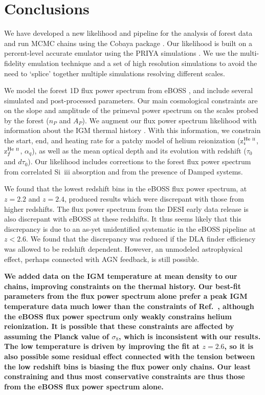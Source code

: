 \section{Conclusions}\label{sec:conclusions}

We have developed a new likelihood and pipeline for the analysis of \Lya forest data and run MCMC chains using the Cobaya package \cite{2021JCAP...05..057T, 2019ascl.soft10019T}.
Our likelihood is built on a percent-level accurate emulator using the PRIYA simulations \cite{2023simsuite}.
We use the multi-fidelity emulation technique \cite{2022MNRAS.517.3200F} and a set of high resolution simulations to avoid the need to `splice' together multiple simulations resolving different scales.

We model the \Lya forest 1D flux power spectrum from eBOSS \cite{2019JCAP...07..017C}, and include several simulated and post-processed parameters.
Our main cosmological constraints are on the slope and amplitude of the primeval power spectrum on the scales probed by the \Lya forest ($n_P$ and $A_P$). 
We augment our \Lya flux power spectrum likelihood with information about the IGM thermal history \cite{2021MNRAS.506.4389G}.
With this information, we constrain the start, end, and heating rate for a patchy model of helium reionization (z$^{\text{He~{\sc ii}}}_i$, z$^{\text{He~{\sc ii}}}_f$, $\alpha_q$), as well as the mean optical depth and its evolution with redshift ($\tau_0$ and $d\tau_0$).
Our likelihood includes corrections to the \lya forest flux power spectrum from correlated Si~{\sc iii} absorption and from the presence of Damped \lya systems.

We found that the lowest redshift bins in the eBOSS flux power spectrum, at $z=2.2$ and $z=2.4$, produced results which were discrepant with those from higher redshifts.
The flux power spectrum from the DESI early data release is also discrepant with eBOSS at these redshifts.
It thus seems likely that this discrepancy is due to an as-yet unidentified systematic in the eBOSS pipeline at $z < 2.6$. We found that the discrepancy was reduced if the DLA finder efficiency was allowed to be redshift dependent. However, an unmodeled astrophysical effect, perhaps connected with AGN feedback, is still possible.  

\textbf{We added data on the IGM temperature at mean density to our chains, improving constraints on the thermal history. Our best-fit parameters from the flux power spectrum alone prefer a peak IGM temperature data much lower than the constraints of Ref.~\cite{2021MNRAS.506.4389G}, although the eBOSS flux power spectrum only weakly constrains helium reionization. It is possible that these constraints are affected by assuming the Planck value of $\sigma_8$, which is inconsistent with our results. The low temperature is driven by improving the fit at $z=2.6$, so it is also possible some residual effect connected with the tension between the low redshift bins is biasing the flux power only chains. Our least constraining and thus most conservative constraints are thus those from the eBOSS flux power spectrum alone.}

